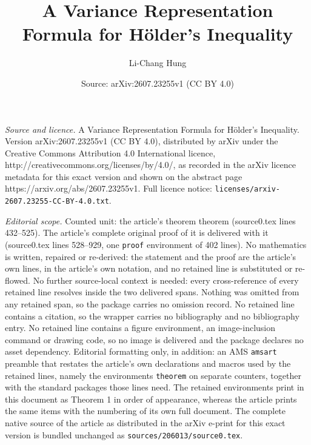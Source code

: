 \documentclass[10pt,a4paper]{amsart}
\title{A Variance Representation Formula for H\"older's Inequality}
\author{Li-Chang Hung}
\date{Source: arXiv:2607.23255v1 (CC BY 4.0)}
\begin{document}
\maketitle

\noindent\emph{Source and licence.} A Variance Representation Formula for H\"older's Inequality. Version arXiv:2607.23255v1 (CC BY 4.0), distributed by arXiv under the Creative Commons Attribution 4.0 International licence, http://creativecommons.org/licenses/by/4.0/, as recorded in the arXiv licence metadata for this exact version and shown on the abstract page https://arxiv.org/abs/2607.23255v1. Full licence notice: \texttt{licenses/arxiv-2607.23255-CC-BY-4.0.txt}.\par\smallskip

\noindent\textit{Editorial scope.} Counted unit: the article's theorem theorem (source0.tex lines 432--525). The article's complete original proof of it is delivered with it (source0.tex lines 528--929, one \texttt{proof} environment of 402 lines). No mathematics is written, repaired or re-derived: the statement and the proof are the article's own lines, in the article's own notation, and no retained line is substituted or re-flowed.  No further source-local context is needed: every cross-reference of every retained line resolves inside the two delivered spans.  Nothing was omitted from any retained span, so the package carries no omission record.  No retained line contains a citation, so the wrapper carries no bibliography and no bibliography entry.  No retained line contains a figure environment, an image-inclusion command or drawing code, so no image is delivered and the package declares no asset dependency.  Editorial formatting only, in addition: an AMS \texttt{amsart} preamble that restates the article's own declarations and macros used by the retained lines, namely the environments \texttt{theorem} on separate counters, together with the standard packages those lines need.  The retained environments print in this document as Theorem 1 in order of appearance, whereas the article prints the same items with the numbering of its own full document.  The complete native source of the article as distributed in the arXiv e-print for this exact version is bundled unchanged as \texttt{sources/206013/source0.tex}.
\end{document}
